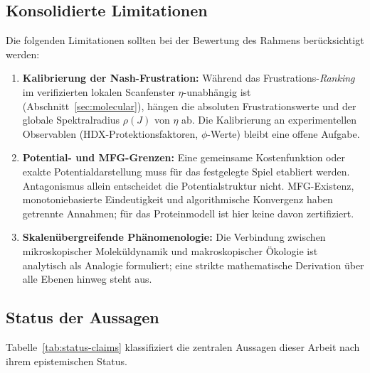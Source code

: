 \documentclass[12pt,a4paper]{article}
\theoremstyle{remark}
\begin{document}
\subsection{Konsolidierte Limitationen}

Die folgenden Limitationen sollten bei der Bewertung des Rahmens berücksichtigt werden:
\begin{enumerate}
    \item \textbf{Kalibrierung der Nash-Frustration:} Während das Frustrations-\emph{Ranking} im verifizierten lokalen Scanfenster $\eta$-unabhängig ist (Abschnitt~\ref{sec:molecular}), hängen die absoluten Frustrationswerte und der globale Spektralradius $\rho(J)$ von $\eta$ ab. Die Kalibrierung an experimentellen Observablen (HDX-Protektionsfaktoren, $\phi$-Werte) bleibt eine offene Aufgabe.
    \item \textbf{Potential- und MFG-Grenzen:} Eine gemeinsame Kostenfunktion oder exakte Potentialdarstellung muss für das festgelegte Spiel etabliert werden. Antagonismus allein entscheidet die Potentialstruktur nicht. MFG-Existenz, monotoniebasierte Eindeutigkeit und algorithmische Konvergenz haben getrennte Annahmen; für das Proteinmodell ist hier keine davon zertifiziert.
    \item \textbf{Skalenübergreifende Phänomenologie:} Die Verbindung zwischen mikroskopischer Moleküldynamik und makroskopischer Ökologie ist analytisch als Analogie formuliert; eine strikte mathematische Derivation über alle Ebenen hinweg steht aus.
\end{enumerate}

\subsection{Status der Aussagen}

Tabelle~\ref{tab:status-claims} klassifiziert die zentralen Aussagen dieser Arbeit nach ihrem epistemischen Status.
\end{document}
